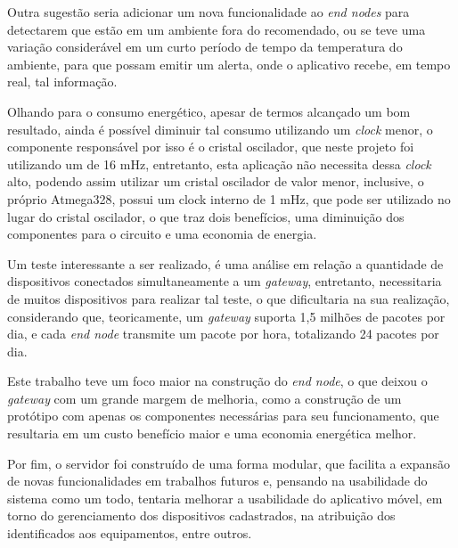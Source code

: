 Outra sugestão seria adicionar um nova funcionalidade ao \textit{end nodes} para detectarem que estão em um ambiente fora do recomendado, ou se teve uma variação considerável em um curto período de tempo da temperatura do ambiente, para que possam emitir um alerta, onde o aplicativo recebe, em tempo real, tal informação.

Olhando para o consumo energético, apesar de termos alcançado um bom resultado, ainda é possível diminuir tal consumo utilizando um \textit{clock} menor, o componente responsável por isso é o cristal oscilador, que neste projeto foi utilizando um de 16 mHz,  entretanto, esta aplicação não necessita dessa \textit{clock} alto, podendo assim utilizar um cristal oscilador de valor menor, inclusive, o próprio Atmega328, possui um clock interno de 1 mHz, que pode ser utilizado no lugar do cristal oscilador, o que traz dois benefícios, uma diminuição dos componentes para o circuito e uma economia de energia.

Um teste interessante a ser realizado, é uma análise em relação a quantidade de dispositivos conectados simultaneamente a um \textit{gateway}, entretanto, necessitaria de muitos dispositivos para realizar tal teste, o que dificultaria na sua realização, considerando que, teoricamente, um \textit{gateway} suporta 1,5 milhões de pacotes por dia, e cada \textit{end node} transmite um pacote por hora, totalizando 24 pacotes por dia.

Este trabalho teve um foco maior na construção do \textit{end node}, o que deixou o \textit{gateway} com um grande margem de melhoria, como a construção de um protótipo com apenas os componentes necessárias para seu funcionamento, que resultaria em um custo benefício maior e uma economia energética melhor.

Por fim, o servidor foi construído de uma forma modular, que facilita a expansão de novas funcionalidades em trabalhos futuros e, pensando na usabilidade do sistema como um todo, tentaria melhorar a usabilidade do aplicativo móvel, em torno do gerenciamento dos dispositivos cadastrados, na atribuição dos identificados aos equipamentos, entre outros.